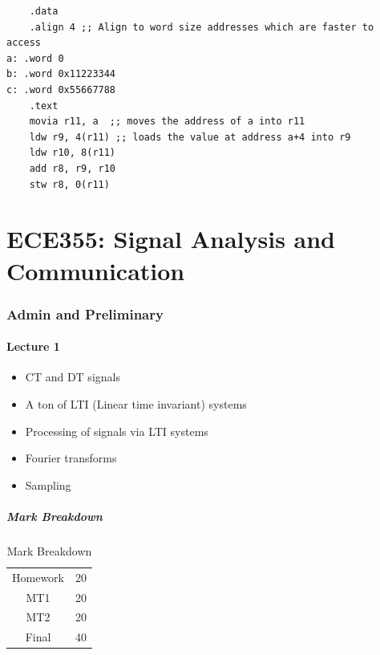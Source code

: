 \documentclass[10pt]{article}
\begin{document}
\begin{listing}[H]
\begin{verbatim}
	.data
	.align 4 ;; Align to word size addresses which are faster to access
a: .word 0
b: .word 0x11223344
c: .word 0x55667788
	.text
	movia r11, a  ;; moves the address of a into r11
	ldw r9, 4(r11) ;; loads the value at address a+4 into r9
	ldw r10, 8(r11)
	add r8, r9, r10
	stw r8, 0(r11)
\end{verbatim}
\end{listing}











\part{ECE355: Signal Analysis and Communication}


\section{Admin and Preliminary}
\subsection{Lecture 1}
\begin{itemize}
	\item  CT and DT signals
	\item A ton of LTI (Linear time invariant) systems
	\item Processing of signals via LTI systems
	\item Fourier transforms
	\item Sampling
\end{itemize}
\subsubsection{Mark Breakdown}

\begin{table}[H]
	\centering
	\caption{Mark Breakdown}
	\begin{tabular}{|c|c|}
		\hline
		Homework & 20 \\
		MT1 & 20 \\
		MT2 & 20 \\
		Final & 40 \\
		\hline
	\end{tabular}
\end{table}
\end{document}
